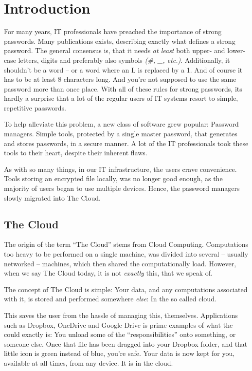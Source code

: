 \chapter{Introduction}
\label{chap:intro}
	For many years, IT professionals have preached the importance of strong passwords. Many publications exists, describing exactly what defines a strong password. The general consensus is, that it needs \emph{at least} both upper- and lower-case letters, digits and preferably also symbols \emph{(\#, \_, etc.)}. Additionally, it shouldn't be a word -- or a word where an L is replaced by a 1. And of course it has to be at least 8 characters long. And you're not supposed to use the same password more than once place. With all of these rules for strong passwords, its hardly a surprise that a lot of the regular users of IT systems resort to simple, repetitive passwords.

	To help alleviate this problem, a new class of software grew popular: Password managers. Simple tools, protected by a single master password, that generates and stores passwords, in a secure manner. A lot of the IT professionals took these tools to their heart, despite their inherent flaws. 

	As with so many things, in our IT infrastructure, the users crave convenience. Tools storing an encrypted file locally, was no longer good enough, as the majority of users began to use multiple devices. Hence, the password managers slowly migrated into The Cloud.

	\section{The Cloud}
		The origin of the term ``The Cloud'' stems from Cloud Computing. Computations too heavy to be performed on a single machine, was divided into several -- usually networked -- machines, which then shared the computationally load. However, when we say The Cloud today, it is not \emph{exactly} this, that we speak of.

		The concept of The Cloud is simple: Your data, and any computations associated with it, is stored and performed somewhere \emph{else}: In the so called cloud.

		This saves the user from the hassle of managing this, themselves. Applications such as Dropbox, OneDrive and Google Drive is prime examples of what the could exactly is: You unload some of the ``responsibilities'' onto something, or someone else. Once that file has been dragged into your Dropbox folder, and that little icon is green instead of blue, you're safe. Your data is now kept for you, available at all times, from any device. It is in the cloud.

